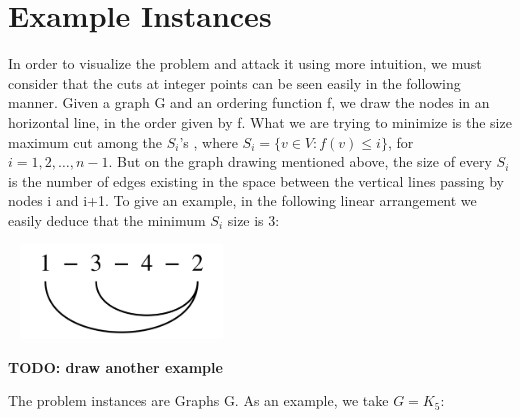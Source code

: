 \section{Example Instances}


In order to visualize the problem and attack it using more intuition, we must consider that the cuts at integer points can 
be seen easily in the following manner. Given a graph G and an ordering function f, we draw the nodes in an horizontal line, in the order given by f. What we are trying to minimize is the size maximum cut among the $S_i$'s , where $S_i=\{v \in V : f(v) \leq i\}$, for $i=1,2,\ldots,n-1$. But on the graph drawing mentioned above, the size of every $S_i$ is the number of edges existing in the space between the vertical lines passing by nodes i and i+1. To give an example, in the following linear
arrangement we easily deduce that the minimum $S_i$ size is 3:


\begin{center}
\includegraphics[height=2.5cm,width=6cm]{img/graph2.png}
\end{center}

\textbf{TODO: draw another example}

The problem instances are Graphs G. As an example, we take $G=K_5$:


